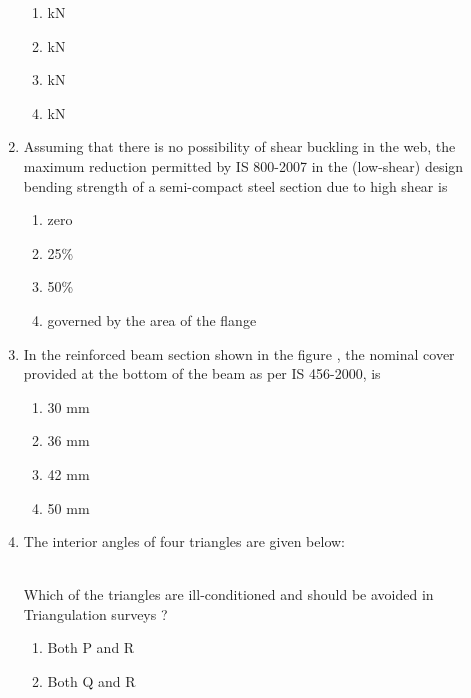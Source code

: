 \documentclass[journal]{IEEEtran}
\begin{document}
\begin{enumerate}
\begin{figure}[!ht]
\centering
\resizebox{0.7\textwidth}{!}{%

}%
\end{figure}
\begin{enumerate}
    \item {}kN
    \item {}kN
    \item {}kN
    \item {}kN \\
\end{enumerate}
\item Assuming that there is no possibility of shear buckling in the web, the maximum reduction permitted by IS 800-2007 in the (low-shear) design bending strength of a semi-compact steel section due to high shear is
 \begin{enumerate}
    \item zero
    \item 25\%
    \item 50\%
    \item governed by the area of the flange \\
\end{enumerate}
\item In the reinforced beam section shown in the figure , the nominal cover provided at the bottom of the beam as per IS 456-2000, is
\begin{figure}[!ht]
\centering
\resizebox{0.5\textwidth}{!}{%

}%
\end{figure}
\pagebreak
\begin{enumerate}
    \item 30 mm
    \item 36 mm
    \item 42 mm
    \item 50 mm \\
\end{enumerate}
\item The interior angles of four triangles are given below:
\begin{table}[h!]
  \centering
  
\end{table}\\
Which of the triangles are ill-conditioned and should be avoided in Triangulation surveys ?
\begin{enumerate}
   \item Both P and R 
   \item Both Q and R 

\end{enumerate}
\end{enumerate}
\end{document}
